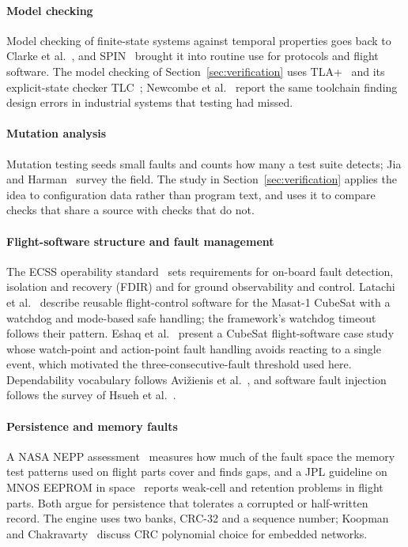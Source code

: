 \documentclass[preprint,12pt]{elsarticle}
\begin{document}
\paragraph{Model checking} Model checking of finite-state systems against temporal properties goes back to Clarke et al.~\cite{Clarke1986ModelChecking}, and SPIN~\cite{Holzmann1997SPIN} brought it into routine use for protocols and flight software. The model checking of Section~\ref{sec:verification} uses TLA+~\cite{Lamport2002TLA} and its explicit-state checker TLC~\cite{Yu1999TLC}; Newcombe et al.~\cite{Newcombe2015AWS} report the same toolchain finding design errors in industrial systems that testing had missed.

\paragraph{Mutation analysis} Mutation testing seeds small faults and counts how many a test suite detects; Jia and Harman~\cite{Jia2011Mutation} survey the field. The study in Section~\ref{sec:verification} applies the idea to configuration data rather than program text, and uses it to compare checks that share a source with checks that do not.

\paragraph{Flight-software structure and fault management} The ECSS operability standard~\cite{ECSS2008Operability} sets requirements for on-board fault detection, isolation and recovery (FDIR) and for ground observability and control. Latachi et al.~\cite{Latachi2020Masat} describe reusable flight-control software for the Masat-1 CubeSat with a watchdog and mode-based safe handling; the framework's watchdog timeout follows their pattern. Eshaq et al.~\cite{Eshaq2025CubeSatFSW} present a CubeSat flight-software case study whose watch-point and action-point fault handling avoids reacting to a single event, which motivated the three-consecutive-fault threshold used here. Dependability vocabulary follows Avi\v{z}ienis et al.~\cite{Avizienis2004Dependability}, and software fault injection follows the survey of Hsueh et al.~\cite{Hsueh1997FaultInjection}.

\paragraph{Persistence and memory faults} A NASA NEPP assessment~\cite{Murphy2022NEPP} measures how much of the fault space the memory test patterns used on flight parts cover and finds gaps, and a JPL guideline on MNOS EEPROM in space~\cite{Chen2006EEPROM} reports weak-cell and retention problems in flight parts. Both argue for persistence that tolerates a corrupted or half-written record. The engine uses two banks, CRC-32 and a sequence number; Koopman and Chakravarty~\cite{Koopman2004CRC} discuss CRC polynomial choice for embedded networks.
\end{document}
